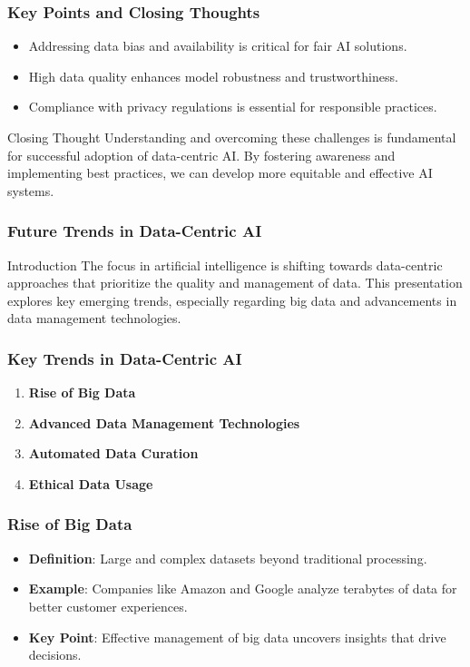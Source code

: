 \documentclass[aspectratio=169]{beamer}
\begin{document}
\begin{frame}[fragile]
    \frametitle{Key Points and Closing Thoughts}
    \begin{itemize}
        \item Addressing data bias and availability is critical for fair AI solutions.
        \item High data quality enhances model robustness and trustworthiness.
        \item Compliance with privacy regulations is essential for responsible practices.
    \end{itemize}
    \begin{block}{Closing Thought}
        Understanding and overcoming these challenges is fundamental for successful adoption of data-centric AI. By fostering awareness and implementing best practices, we can develop more equitable and effective AI systems.
    \end{block}
\end{frame}

\begin{frame}[fragile]
    \frametitle{Future Trends in Data-Centric AI}
    \begin{block}{Introduction}
        The focus in artificial intelligence is shifting towards data-centric approaches that prioritize the quality and management of data. This presentation explores key emerging trends, especially regarding big data and advancements in data management technologies.
    \end{block}
\end{frame}

\begin{frame}[fragile]
    \frametitle{Key Trends in Data-Centric AI}
    \begin{enumerate}
        \item \textbf{Rise of Big Data}
        \item \textbf{Advanced Data Management Technologies}
        \item \textbf{Automated Data Curation}
        \item \textbf{Ethical Data Usage}
    \end{enumerate}
\end{frame}

\begin{frame}[fragile]
    \frametitle{Rise of Big Data}
    \begin{itemize}
        \item \textbf{Definition}: Large and complex datasets beyond traditional processing.
        \item \textbf{Example}: Companies like Amazon and Google analyze terabytes of data for better customer experiences.
        \item \textbf{Key Point}: Effective management of big data uncovers insights that drive decisions.
    \end{itemize}
\end{frame}
\end{document}
